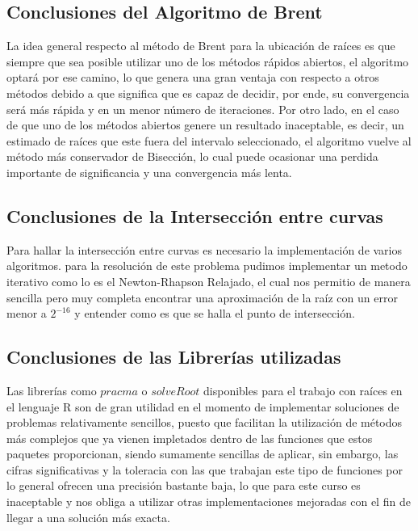 \documentclass[a4paper,12pt]{article}
\begin{document}
\subsection{Conclusiones del Algoritmo de Brent}

La idea general respecto al método de Brent para la
ubicación de raíces es que siempre que sea posible
utilizar uno de los métodos rápidos abiertos, el algoritmo optará por ese camino, lo que genera una gran ventaja con respecto a otros métodos debido a que significa que es capaz de decidir, por ende, su convergencia será más rápida y en un menor número de iteraciones.
Por otro lado, en el caso de que uno de los métodos abiertos genere un resultado inaceptable, es decir, un estimado de raíces que este fuera del intervalo seleccionado, el algoritmo vuelve al método más conservador de Bisección, lo cual puede ocasionar una perdida importante de significancia y una convergencia más lenta.
 \par

\subsection{Conclusiones de la Intersección entre curvas}

Para hallar la intersección entre curvas es necesario la implementación de varios algoritmos. para la resolución de este problema pudimos implementar un metodo iterativo como lo es el Newton-Rhapson Relajado, el cual nos permitio de manera sencilla pero muy completa encontrar una aproximación de la raíz con un error menor a \(2^{-16}\) y entender como es que se halla el punto de intersección.\par

\subsection{Conclusiones de las Librerías utilizadas}

Las librerías como $pracma$ o $solveRoot$ disponibles para el trabajo con raíces en el lenguaje R son de gran utilidad en el momento de implementar soluciones de problemas relativamente sencillos, puesto que facilitan la utilización de métodos más complejos que ya vienen impletados dentro de las funciones que estos paquetes proporcionan, siendo sumamente sencillas de aplicar, sin embargo, las cifras significativas y la toleracia con las que trabajan este tipo de funciones por lo general ofrecen una precisión bastante baja, lo que para este curso es inaceptable y nos obliga a utilizar otras implementaciones mejoradas con el fin de llegar a una solución más exacta. \par

\newpage




\end{document}
